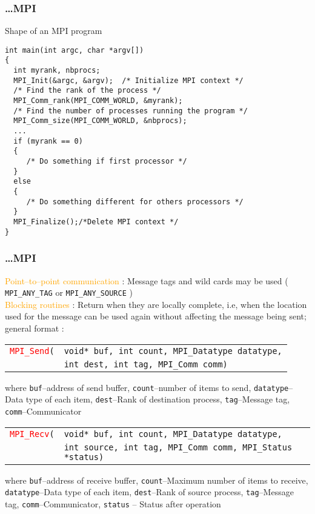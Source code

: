 \documentclass{beamer}
\begin{document}
\begin{frame}[fragile]
\frametitle{\ldots MPI}

\begin{block}{Shape of an MPI program}
\begin{lstlisting}
int main(int argc, char *argv[])
{
  int myrank, nbprocs;
  MPI_Init(&argc, &argv);  /* Initialize MPI context */
  /* Find the rank of the process */
  MPI_Comm_rank(MPI_COMM_WORLD, &myrank);
  /* Find the number of processes running the program */
  MPI_Comm_size(MPI_COMM_WORLD, &nbprocs);
  ...
  if (myrank == 0)
  {
     /* Do something if first processor */
  }
  else
  {
     /* Do something different for others processors */
  }
  MPI_Finalize();/*Delete MPI context */
}
\end{lstlisting}
\end{block}
\end{frame}

\begin{frame}
\frametitle{\ldots MPI}
\textcolor{orange}{Point--to--point communication} : Message tags
and wild cards may be used ( \texttt{MPI\_ANY\_TAG} or
\texttt{MPI\_ANY\_SOURCE} )\\[5mm]

\textcolor{orange}{Blocking routines} : Return when they are
locally complete, i.e, when the location used for the message
can be used again without affecting the message being sent;
general format :

{\scriptsize
\begin{tabular}{ll}
\texttt{\textcolor{red}{MPI\_Send}(}& \texttt{void* buf, int count, MPI\_Datatype datatype,}\\
                                  & \texttt{int dest, int tag, MPI\_Comm comm)}
\end{tabular}
where \texttt{buf}--address of send buffer, 
      \texttt{count}--number of items to send,
      \texttt{datatype}--Data type of each item,
      \texttt{dest}--Rank of destination process,
      \texttt{tag}--Message tag,
      \texttt{comm}--Communicator\\
\begin{tabular}{ll}
\texttt{\textcolor{red}{MPI\_Recv}(}& \texttt{void* buf, int count, MPI\_Datatype datatype,}\\
                                  & \texttt{int source, int tag, MPI\_Comm comm, MPI\_Status *status)}
\end{tabular}
where \texttt{buf}--address of receive buffer, 
      \texttt{count}--Maximum number of items to receive,
      \texttt{datatype}--Data type of each item,
      \texttt{dest}--Rank of source process,
      \texttt{tag}--Message tag,
      \texttt{comm}--Communicator,
      \texttt{status} -- Status after operation
}

\end{frame}
\end{document}

